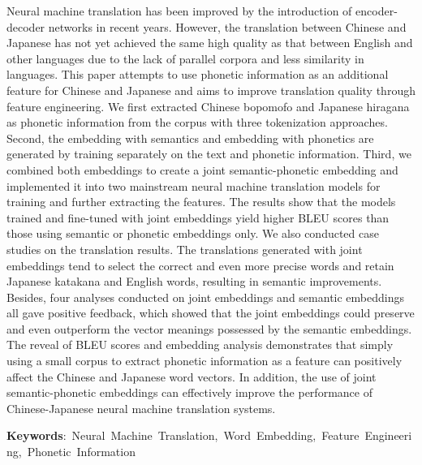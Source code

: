 Neural machine translation has been improved by the introduction of encoder-decoder networks in recent years. However, the translation between Chinese and Japanese has not yet achieved the same high quality as that between English and other languages due to the lack of parallel corpora and less similarity in languages. This paper attempts to use phonetic information as an additional feature for Chinese and Japanese and aims to improve translation quality through feature engineering. We first extracted Chinese bopomofo and Japanese hiragana as phonetic information from the corpus with three tokenization approaches. Second, the embedding with semantics and embedding with phonetics are generated by training separately on the text and phonetic information. Third, we combined both embeddings to create a joint semantic-phonetic embedding and implemented it into two mainstream neural machine translation models for training and further extracting the features. The results show that the models trained and fine-tuned with joint embeddings yield higher BLEU scores than those using semantic or phonetic embeddings only. We also conducted case studies on the translation results. The translations generated with joint embeddings tend to select the correct and even more precise words and retain Japanese katakana and English words, resulting in semantic improvements. Besides, four analyses conducted on joint embeddings and semantic embeddings all gave positive feedback, which showed that the joint embeddings could preserve and even outperform the vector meanings possessed by the semantic embeddings. The reveal of BLEU scores and embedding analysis demonstrates that simply using a small corpus to extract phonetic information as a feature can positively affect the Chinese and Japanese word vectors. In addition, the use of joint semantic-phonetic embeddings can effectively improve the performance of Chinese-Japanese neural machine translation systems.

\begin{flushleft}
\mbox{{\bf Keywords}: Neural Machine Translation, Word Embedding, Feature Engineering, Phonetic Information}
\end{flushleft}